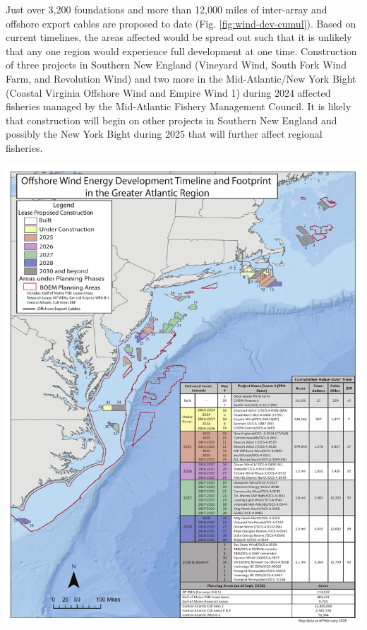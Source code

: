 \documentclass[
  10pt,
]{article}
\let\origfigure\figure
\let\endorigfigure\endfigure
\renewenvironment{figure}[1][2] {
    \expandafter\origfigure\expandafter[H]
} {
    \endorigfigure
}
\begin{document}
Just over 3,200 foundations and more than 12,000 miles of inter-array and offshore export cables are proposed to date (Fig. \ref{fig:wind-dev-cumul}). Based on current timelines, the areas affected would be spread out such that it is unlikely that any one region would experience full development at one time. Construction of three projects in Southern New England (Vineyard Wind, South Fork Wind Farm, and Revolution Wind) and two more in the Mid-Atlantic/New York Bight (Coastal Virginia Offshore Wind and Empire Wind 1) during 2024 affected fisheries managed by the Mid-Atlantic Fishery Management Council. It is likely that construction will begin on other projects in Southern New England and possibly the New York Bight during 2025 that will further affect regional fisheries.

\begin{figure}

{\centering \includegraphics[width=0.9\linewidth]{midatlantic_files/figure-latex/wind-dev-cumul-1} 

}

\caption{All Northeast Project areas by year construction ends (each project has a 2 year construction period).}\label{fig:wind-dev-cumul}
\end{figure}
\end{document}
